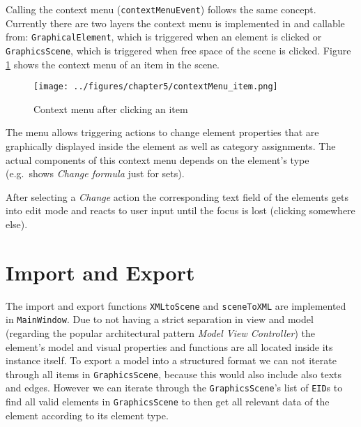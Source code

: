 \documentclass[twoside, openright, 12pt]{book}
\begin{document}
Calling the context menu (\texttt{contextMenuEvent}) follows the same concept.
Currently there are two layers the context menu is implemented in and callable from: \texttt{GraphicalElement}, which is triggered when an element is clicked or \texttt{GraphicsScene}, which is triggered when free space of the scene is clicked.
Figure \ref{fig:contextMenu_item} shows the context menu of an item in the scene.


\begin{figure}[htb]
	\centering
	\texttt{[image: ../figures/chapter5/contextMenu\_item.png]}
	\caption{Context menu after clicking an item}
	\label{fig:contextMenu_item}
\end{figure}

\noindent
The menu allows triggering actions to change element properties that are graphically displayed inside the element as well as category assignments.
The actual components of this context menu depends on the element's type (e.g.\ shows \textit{Change formula} just for sets).

After selecting a \textit{Change} action the corresponding text field of the elements gets into edit mode and reacts to user input until the focus is lost (clicking somewhere else).



\section{Import and Export}
\label{implementation_importexport}
The import and export functions \texttt{XMLtoScene} and \texttt{sceneToXML} are implemented in \texttt{MainWindow}.
Due to not having a strict separation in view and model (regarding the popular architectural pattern \textit{Model View Controller}) the element's model and visual properties and functions are all located inside its instance itself.
To export a model into a structured format we can not iterate through all items in \texttt{GraphicsScene}, because this would also include also texts and edges.
However we can iterate through the \texttt{GraphicsScene}'s list of \texttt{EID}s to find all valid elements in \texttt{GraphicsScene} to then get all relevant data of the element according to its element type.
\end{document}
